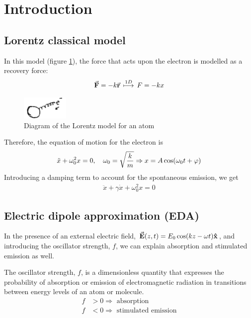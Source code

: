 \section{Introduction}
\subsection{Lorentz classical model}
In this model (figure \ref{fig:lorentz-model}), the force that acts upon the electron is modelled as a recovery force:
\begin{align}
	\va{F} = - k \va{r} \, \overset{1D}{\longmapsto} \, F = - k x
\end{align}
\begin{figure}[H]
	\centering
	\includegraphics[width=0.2\textwidth]{./images/1-lorentz-model}
	\caption{Diagram of the Lorentz model for an atom}
	\label{fig:lorentz-model}
\end{figure}

Therefore, the equation of motion for the electron is
\begin{align*}
	\ddot{x} + \omega_{0}^{2}x = 0 \qc \omega_{0} = \sqrt{\frac{k}{m}} \Rightarrow x = A \cos(\omega_{0} t + \varphi)
\end{align*}
Introducing a damping term to account for the spontaneous emission, we get
\begin{align}
	\ddot{x} + \gamma \dot{x} + \omega_{0}^{2}x = 0
\end{align}

\subsection[Electric dipole approximation]{Electric dipole approximation (EDA)}
In the presence of an external electric field, $\va{E}(z,t) = E_{0} \cos(kz - \omega t) \vu{x}$, and introducing the oscillator strength, $f$, we can explain absorption and stimulated emission as well.

\begin{defi}
	The oscillator strength, $f$, is a dimensionless quantity that expresses the probability of absorption or emission of electromagnetic radiation in transitions between energy levels of an atom or molecule.
	\begin{align*}
		f &> 0 \Rightarrow \text{ absorption} \\
		f &< 0 \Rightarrow \text{ stimulated emission}
	\end{align*}
\end{defi}

